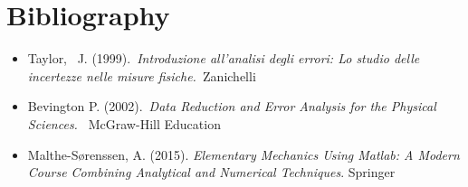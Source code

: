 \documentclass[11pt,a4paper]{article}
\begin{document}
\section{Bibliography}
\begin{itemize}
\item
  Taylor,~ J. (1999).~\emph{Introduzione all'analisi degli errori: Lo
  studio delle incertezze nelle misure fisiche.~}Zanichelli
\item
  Bevington P. (2002).~\emph{Data Reduction and Error Analysis for the
  Physical Sciences.~} McGraw-Hill Education ~
\item Malthe-Sørenssen, A. (2015). \emph{Elementary Mechanics Using Matlab: A Modern Course Combining Analytical and Numerical Techniques}. Springer
\end{itemize}
\end{document}
